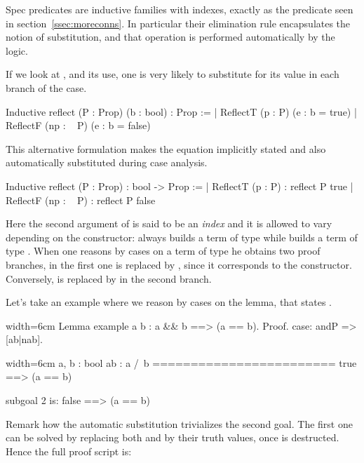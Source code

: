 Spec predicates are inductive families with indexes, exactly
as the  predicate seen in section~\ref{ssec:moreconns}.
In particular their elimination rule encapsulates the notion
of substitution, and that operation is performed automatically by
the logic.

If we look at , and its use, one is very likely to substitute 
for its value in each branch of the case.

\begin{coq}{}{}
Inductive reflect (P : Prop) (b : bool) : Prop :=
| ReflectT (p : P)    (e : b = true)
| ReflectF (np : ~ P) (e : b = false)
\end{coq}

This alternative formulation makes the equation implicitly stated and
also automatically substituted during case analysis.

\begin{coq}{}{}
Inductive reflect (P : Prop) : bool -> Prop :=
| ReflectT (p : P)    : reflect P true
| ReflectF (np : ~ P) : reflect P false
\end{coq}

Here the second argument of  is said to be an \emph{index}
and it is allowed to vary depending on the constructor:  always
builds a term of type  while  builds
a term of type .  When one reasons
by cases on a term of type  he obtains two proof
branches, in the first one  is replaced by , since it
corresponds to the  constructor.  Conversely,
 is replaced by  in the second branch.

Let's take an example where we reason by cases on the  lemma,
that states .

\begin{coq-left}{}{width=6cm}
Lemma example a b :
  a && b ==> (a == b).
Proof.
case: andP => [ab|nab].
$~$
$~$
\end{coq-left}
\begin{coqout-right}{}{width=6cm}
a, b : bool
ab : a /\ b
========================
true ==> (a == b)

subgoal 2 is:
false ==> (a == b)
\end{coqout-right}

Remark how the automatic substitution trivializes the
second goal.  The first one can be solved by replacing
both  and  by their truth values, once 
is destructed.  Hence the full proof script is:

